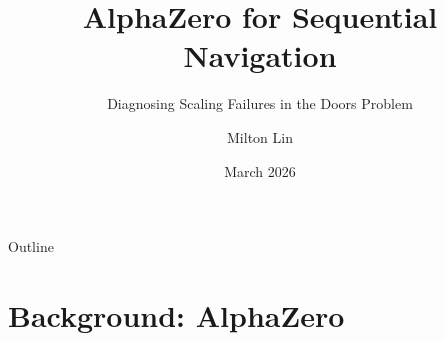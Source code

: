 \documentclass[aspectratio=169, 10pt]{beamer}
\title{AlphaZero for Sequential Navigation}
\subtitle{Diagnosing Scaling Failures in the Doors Problem}
\author{Milton Lin}
\date{March 2026}
\begin{document}
\begin{frame}
  \titlepage
\end{frame}

\begin{frame}{Outline}
  \tableofcontents
\end{frame}

\section{Background: AlphaZero}
\end{document}
